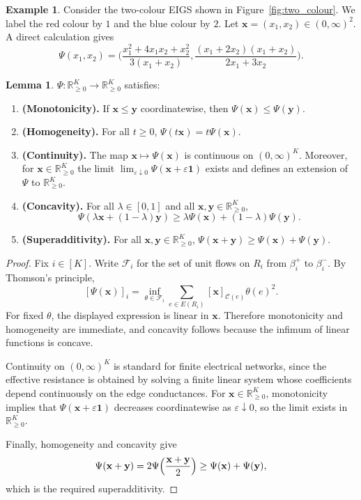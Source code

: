 \documentclass{article}
\theoremstyle{plain}
\theoremstyle{definition}
\newtheorem{lemma}[theorem]{Lemma}
\newtheorem{example}[theorem]{Example}
\begin{document}
\begin{example}\label{ex:Psi_two_colours}
Consider the two-colour EIGS shown in Figure~\ref{fig:two_colour}.
We label the red colour by $1$ and the blue colour by $2$.
Let $\mathbf x=(x_1,x_2)\in(0,\infty)^2$.
A direct calculation gives
\[
\Psi(x_1,x_2)
=
\Big(
\frac{x_1^2+4x_1x_2+x_2^2}{3(x_1+x_2)},
\frac{(x_1+2x_2)(x_1+x_2)}{2x_1+3x_2}
\Big).
\]
\end{example}

\begin{lemma}\label{lem:psi-props}
$\Psi:\mathbb R_{\ge 0}^K\to \mathbb R_{\ge 0}^K$ satisfies:
\begin{enumerate}
\item \textbf{(Monotonicity).}
If $\mathbf x\le \mathbf y$ coordinatewise, then
$
\Psi(\mathbf x)\le \Psi(\mathbf y).
$

\item \textbf{(Homogeneity).}
For all $t\ge 0$,
$
\Psi(t\mathbf x)=t\Psi(\mathbf x).
$

\item \textbf{(Continuity).}
The map $\mathbf x\mapsto \Psi(\mathbf x)$ is continuous on $(0,\infty)^K$.
Moreover, for $\mathbf x\in\mathbb R_{\ge 0}^K$ the limit
$
\lim_{\varepsilon\downarrow 0}\Psi(\mathbf x+\varepsilon\mathbf 1)
$
exists and defines an extension of $\Psi$ to $\mathbb R_{\ge 0}^K$.

\item \textbf{(Concavity).}
For all $\lambda\in[0,1]$ and all $\mathbf x,\mathbf y\in\mathbb R_{\ge 0}^K$,
\[
\Psi(\lambda\mathbf x+(1-\lambda)\mathbf y)
\ge
\lambda \Psi(\mathbf x)+(1-\lambda)\Psi(\mathbf y).
\]

\item \textbf{(Superadditivity).}
For all $\mathbf x,\mathbf y\in\mathbb R_{\ge 0}^K$,
$
\Psi(\mathbf x+\mathbf y)\ge \Psi(\mathbf x)+\Psi(\mathbf y).
$
\end{enumerate}
\end{lemma}

\begin{proof}
Fix $i\in[K]$.
Write $\mathcal F_i$ for the set of unit flows on $R_i$ from $\beta_i^+$ to $\beta_i^-$.
By Thomson's principle,
\[
[\Psi(\mathbf x)]_i
=
\inf_{\theta\in \mathcal F_i}
\sum_{e\in E(R_i)} [\mathbf x]_{\mathscr C(e)}\theta(e)^2.
\]
For fixed $\theta$, the displayed expression is linear in $\mathbf x$.
Therefore monotonicity and homogeneity are immediate, and concavity follows because the infimum of linear functions is concave.

Continuity on $(0,\infty)^K$ is standard for finite electrical networks, since the effective resistance is obtained by solving a finite linear system whose coefficients depend continuously on the edge conductances.
For $\mathbf x\in\mathbb R_{\ge 0}^K$, monotonicity implies that $\Psi(\mathbf x+\varepsilon\mathbf 1)$ decreases coordinatewise as $\varepsilon\downarrow 0$, so the limit exists in $\mathbb R_{\ge 0}^K$.

Finally, homogeneity and concavity give
\[
\Psi(\mathbf x+\mathbf y)
=
2\Psi\Bigl(\frac{\mathbf x+\mathbf y}{2}\Bigr)
\ge
\Psi(\mathbf x)+\Psi(\mathbf y),
\]
which is the required superadditivity.
\end{proof}
\end{document}
